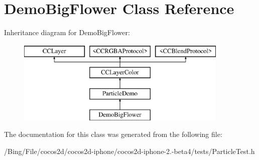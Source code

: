 \hypertarget{interface_demo_big_flower}{\section{Demo\-Big\-Flower Class Reference}
\label{interface_demo_big_flower}
}
Inheritance diagram for Demo\-Big\-Flower\-:\begin{figure}[H]
\begin{center}
\leavevmode
\includegraphics[height=4.000000cm]{interface_demo_big_flower}
\end{center}
\end{figure}


The documentation for this class was generated from the following file\-:\begin{DoxyCompactItemize}
\item 
/\-Bing/\-File/cocos2d/cocos2d-\/iphone/cocos2d-\/iphone-\/2.-\/beta4/tests/Particle\-Test.\-h\end{DoxyCompactItemize}
